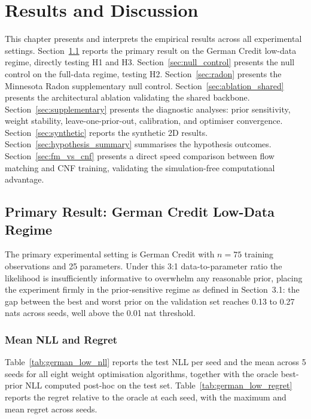 \chapter{Results and Discussion}
\label{chap:results}

This chapter presents and interprets the 
empirical results across all experimental 
settings. Section~\ref{sec:primary} reports 
the primary result on the German Credit 
low-data regime, directly testing H1 and H3. 
Section~\ref{sec:null_control} presents the 
null control on the full-data regime, testing 
H2. Section~\ref{sec:radon} presents the 
Minnesota Radon supplementary null control. 
Section~\ref{sec:ablation_shared} presents 
the architectural ablation validating the 
shared backbone. Section~\ref{sec:supplementary} 
presents the diagnostic analyses: prior 
sensitivity, weight stability, 
leave-one-prior-out, calibration, and 
optimiser convergence. 
Section~\ref{sec:synthetic} reports the 
synthetic 2D results. 
Section~\ref{sec:hypothesis_summary} 
summarises the hypothesis outcomes.
Section~\ref{sec:fm_vs_cnf} presents a 
direct speed comparison between flow 
matching and CNF training, validating 
the simulation-free computational advantage.

\section{Primary Result: German Credit 
Low-Data Regime}
\label{sec:primary}

The primary experimental setting is German 
Credit with $n = 75$ training observations 
and 25 parameters. Under this 3:1 
data-to-parameter ratio the likelihood 
is insufficiently informative to overwhelm 
any reasonable prior, placing the experiment 
firmly in the prior-sensitive regime as 
defined in Section~3.1: the gap between 
the best and worst prior on the validation 
set reaches 0.13 to 0.27 nats across seeds, 
well above the 0.01 nat threshold.

\subsection{Mean NLL and Regret}

Table~\ref{tab:german_low_nll} reports the 
test NLL per seed and the mean across 5 
seeds for all eight weight optimisation 
algorithms, together with the oracle 
best-prior NLL computed post-hoc on the 
test set. Table~\ref{tab:german_low_regret} 
reports the regret relative to the oracle 
at each seed, with the maximum and mean 
regret across seeds.

